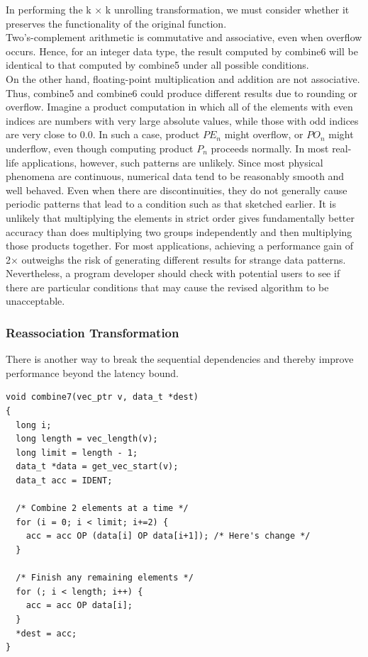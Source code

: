 \documentclass[11pt]{article}
\begin{document}
In performing the k × k unrolling transformation, we must consider whether it preserves the functionality of the original function.\\
Two’s-complement arithmetic is commutative and associative, even when overflow occurs. Hence, for an integer data type, the result computed by combine6 will be identical to that computed by combine5 under all possible conditions.\\
On the other hand, floating-point multiplication and addition are not associative. Thus, combine5 and combine6 could produce different results due to rounding or overflow. Imagine a product computation in which all of the elements with even indices are numbers with very large absolute values, while those with odd indices are very close to 0.0. In such a case, product \(PE_n\) might overflow, or \(PO_n\) might underflow, even though computing product \(P_n\) proceeds normally. In most real-life applications, however, such patterns are unlikely. Since most physical phenomena are continuous, numerical data tend to be reasonably smooth and well behaved. Even when there are discontinuities, they do not generally cause periodic patterns that lead to a condition such as that sketched earlier. It is unlikely that multiplying the elements in strict order gives fundamentally better accuracy than does multiplying two groups independently and then multiplying those products together. For most applications, achieving a performance gain of 2× outweighs the risk of generating different results for strange data patterns. Nevertheless, a program developer should check with potential users to see if there are particular conditions that may cause the revised algorithm to be unacceptable.\\

\subsubsection{Reassociation Transformation}
\label{sec:orgd650653}

There is another way to break the sequential dependencies and thereby improve performance beyond the latency bound.\\
\begin{verbatim}
void combine7(vec_ptr v, data_t *dest)
{
  long i;
  long length = vec_length(v);
  long limit = length - 1;
  data_t *data = get_vec_start(v);
  data_t acc = IDENT;

  /* Combine 2 elements at a time */
  for (i = 0; i < limit; i+=2) {
    acc = acc OP (data[i] OP data[i+1]); /* Here's change */
  }

  /* Finish any remaining elements */
  for (; i < length; i++) {
    acc = acc OP data[i];
  }
  *dest = acc;
}

\end{verbatim}
\end{document}

